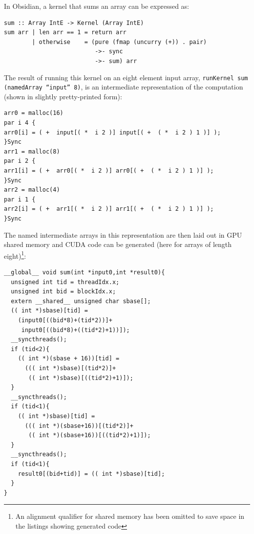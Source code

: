 \documentclass[]{sigplanconf}
\begin{document}
In Obsidian, a kernel that sums an array can be expressed as: 
\begin{codesize}
\begin{verbatim}
sum :: Array IntE -> Kernel (Array IntE) 
sum arr | len arr == 1 = return arr
        | otherwise    = (pure (fmap (uncurry (+)) . pair) 
                          ->- sync 
                          ->- sum) arr                       
\end{verbatim}
\end{codesize}
The result of running this kernel on an eight element input array, 
{\tt runKernel sum (namedArray ``input'' 8)}, is an intermediate representation 
of the computation (shown in slightly pretty-printed form): 
\begin{codesize}
\begin{verbatim}
arr0 = malloc(16)
par i 4 {
arr0[i] = ( +  input[( *  i 2 )] input[( +  ( *  i 2 ) 1 )] );
}Sync
arr1 = malloc(8)
par i 2 {
arr1[i] = ( +  arr0[( *  i 2 )] arr0[( +  ( *  i 2 ) 1 )] );
}Sync
arr2 = malloc(4)
par i 1 {
arr2[i] = ( +  arr1[( *  i 2 )] arr1[( +  ( *  i 2 ) 1 )] );
}Sync
\end{verbatim}
\end{codesize}
The named intermediate arrays in this representation are then laid 
out in GPU shared memory and CUDA code can be generated (here for arrays of length eight)\footnote{An alignment qualifier for shared memory 
has been omitted to save space in the listings showing generated code}: 
\begin{codesize}
\begin{verbatim}
__global__ void sum(int *input0,int *result0){
  unsigned int tid = threadIdx.x;
  unsigned int bid = blockIdx.x;
  extern __shared__ unsigned char sbase[];
  (( int *)sbase)[tid] = 
    (input0[((bid*8)+(tid*2))]+
     input0[((bid*8)+((tid*2)+1))]);
  __syncthreads();
  if (tid<2){
    (( int *)(sbase + 16))[tid] = 
      ((( int *)sbase)[(tid*2)]+
       (( int *)sbase)[((tid*2)+1)]);
  }
  __syncthreads();
  if (tid<1){
    (( int *)sbase)[tid] = 
      ((( int *)(sbase+16))[(tid*2)]+
       (( int *)(sbase+16))[((tid*2)+1)]);
  }
  __syncthreads();
  if (tid<1){
    result0[(bid+tid)] = (( int *)sbase)[tid];
  }
}
\end{verbatim}
\end{codesize}
\end{document}
